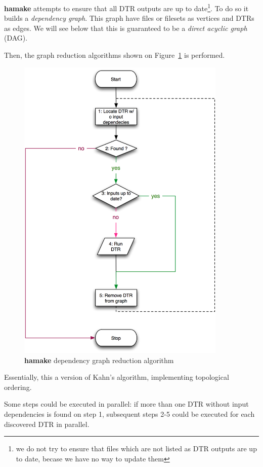 \documentclass{article}
\begin{document}
\textbf{hamake} attempts to ensure that all DTR outputs are up to
date\footnote{we do not try to ensure that files which are not listed
  as DTR outputs are up to date, becase we have no way to update
  them}. To do so it builds a \textit{dependency graph}. This graph
have files or filesets as vertices and DTRs as edges. We will see
below that this is guaranteed to be a \textit{direct acyclic graph}
(DAG).

Then, the graph reduction algorithms shown on Figure~\ref{fig:grred}
is performed.

\begin{figure}[htp]
\centering
\includegraphics[width=10cm]{GraphReduction.png}
\caption{\textbf{hamake} dependency graph reduction algorithm}
\label{fig:grred}
\end{figure}

Essentially, this a version of Kahn's
algorithm\cite{kahn1962topological}, implementing topological
ordering\cite{wiki:topsort}.

Some steps could be executed in parallel: if more than one DTR without
input dependencies is found on step 1, subsequent steps 2-5 could be
executed for each discovered DTR in parallel.
\end{document}
